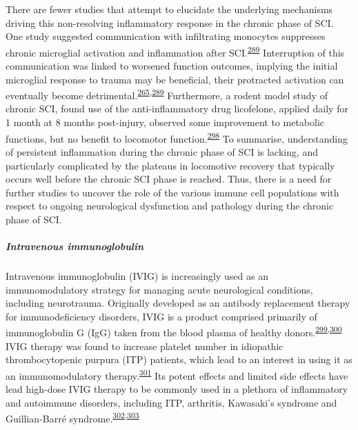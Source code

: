 \documentclass[
]{article}
\begin{document}
There are fewer studies that attempt to elucidate the underlying mechanisms driving this non-resolving inflammatory response in the chronic phase of SCI.
One study suggested communication with infiltrating monocytes suppresses chronic microglial activation and inflammation after SCI.\textsuperscript{\protect\hyperlink{ref-greenhalgh_peripherally_2018}{289}}
Interruption of this communication was linked to worsened function outcomes, implying the initial microglial response to trauma may be beneficial, their protracted activation can eventually become detrimental.\textsuperscript{\protect\hyperlink{ref-bellver-landete_microglia_2019}{265},\protect\hyperlink{ref-greenhalgh_peripherally_2018}{289}}
Furthermore, a rodent model study of chronic SCI, found use of the anti-inflammatory drug licofelone, applied daily for 1 month at 8 months post-injury, observed some improvement to metabolic functions, but no benefit to locomotor function.\textsuperscript{\protect\hyperlink{ref-dulin_licofelone_2013}{298}}
To summarise, understanding of persistent inflammation during the chronic phase of SCI is lacking, and particularly complicated by the plateaus in locomotive recovery that typically occurs well before the chronic SCI phase is reached.
Thus, there is a need for further studies to uncover the role of the various immune cell populations with respect to ongoing neurological dysfunction and pathology during the chronic phase of SCI.

\hypertarget{intravenous-immunoglobulin}{%
\subparagraph{Intravenous immunoglobulin}\label{intravenous-immunoglobulin}}

Intravenous immunoglobulin (IVIG) is increasingly used as an immunomodulatory strategy for managing acute neurological conditions, including neurotrauma.
Originally developed as an antibody replacement therapy for immunodeficiency disorders, IVIG is a product comprised primarily of immunoglobulin G (IgG) taken from the blood plasma of healthy donors.\textsuperscript{\protect\hyperlink{ref-bayry_intravenous_2011}{299},\protect\hyperlink{ref-schwab_intravenous_2013}{300}}
IVIG therapy was found to increase platelet number in idiopathic thrombocytopenic purpura (ITP) patients, which lead to an interest in using it as an immunomodulatory therapy.\textsuperscript{\protect\hyperlink{ref-imbach_high-dose_1981}{301}}
Its potent effects and limited side effects have lead high-dose IVIG therapy to be commonly used in a plethora of inflammatory and autoimmune disorders, including ITP, arthritis, Kawasaki's syndrome and Guillian-Barré syndrome.\textsuperscript{\protect\hyperlink{ref-lunemann_intravenous_2015}{302},\protect\hyperlink{ref-stangel_intravenous_1998}{303}}
\end{document}
